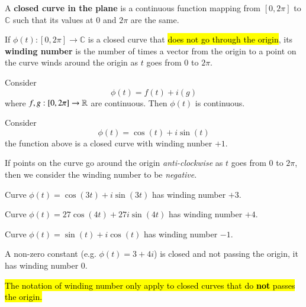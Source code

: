\documentclass[10pt]{article}
\begin{document}
		\begin{definition}
			A \textbf{closed curve in the plane} is a continuous function mapping from $[0, 2\pi]$ to $\mathbb{C}$ such that its values at $0$ and $2\pi$ are the same.
		\end{definition}

		\begin{definition}
			If $\phi(t): [0, 2\pi] \to \mathbb{C}$ is a closed curve that \hl{does not go through the origin}, its \textbf{winding number} is the number of times a vector from the origin to a point on the curve winds around the origin as $t$ goes from $0$ to $2\pi$.
		\end{definition}

		\begin{example}
			Consider 
			\[
				\phi(t) = f(t) + i(g)
			\]
			where $f,g: [0, 2\pi] \to \mathbb{R}$ are continuous. Then $\phi(t)$ is continuous.
		\end{example}

		\begin{example}
			Consider 
			\[
				\phi(t) = \cos(t) + i\sin(t)
			\]
			the function above is a closed curve with winding nunber $+1$.
		\end{example}

		\begin{remark}
			If points on the curve go around the origin \emph{anti-clockwise} as $t$ goes from $0$ to $2\pi$, then we consider the winding number to be \emph{negative}.
		\end{remark}

		\begin{example}
			Curve $\phi(t) = \cos(3t) + i \sin(3t)$ has winding number $+3$.
		\end{example}

		\begin{example}
			Curve $\phi(t) = 27\cos(4t) + 27 i \sin(4t)$ has winding number $+4$.
		\end{example}
		
		\begin{example}
			Curve $\phi(t) = \sin(t) + i \cos(t)$ has winding number $-1$.
		\end{example}
		
		\begin{example}
			A non-zero constant (e.g. $\phi(t)=3+4i$) is closed and not passing the origin, it has winding number $0$.
		\end{example}
		
		\begin{remark}
			\hl{The notation of winding number only apply to closed curves that do \textbf{not} passes the origin.}
		\end{remark}
\end{document}
